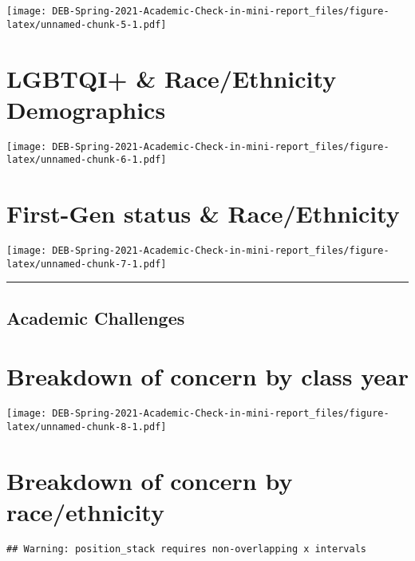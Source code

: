 \documentclass[
]{article}
\begin{document}
\texttt{[image: DEB-Spring-2021-Academic-Check-in-mini-report\_files/figure-latex/unnamed-chunk-5-1.pdf]}

\hypertarget{lgbtqi-raceethnicity-demographics}{%
\section{LGBTQI+ \& Race/Ethnicity
Demographics}\label{lgbtqi-raceethnicity-demographics}}

\texttt{[image: DEB-Spring-2021-Academic-Check-in-mini-report\_files/figure-latex/unnamed-chunk-6-1.pdf]}

\hypertarget{first-gen-status-raceethnicity}{%
\section{First-Gen status \&
Race/Ethnicity}\label{first-gen-status-raceethnicity}}

\texttt{[image: DEB-Spring-2021-Academic-Check-in-mini-report\_files/figure-latex/unnamed-chunk-7-1.pdf]}

\begin{center}\rule{0.5\linewidth}{0.5pt}\end{center}

\hypertarget{academic-challenges}{%
\subsection{Academic Challenges}\label{academic-challenges}}

\hypertarget{breakdown-of-concern-by-class-year}{%
\section{Breakdown of concern by class
year}\label{breakdown-of-concern-by-class-year}}

\texttt{[image: DEB-Spring-2021-Academic-Check-in-mini-report\_files/figure-latex/unnamed-chunk-8-1.pdf]}

\hypertarget{breakdown-of-concern-by-raceethnicity}{%
\section{Breakdown of concern by
race/ethnicity}\label{breakdown-of-concern-by-raceethnicity}}

\begin{verbatim}
## Warning: position_stack requires non-overlapping x intervals
\end{verbatim}
\end{document}
